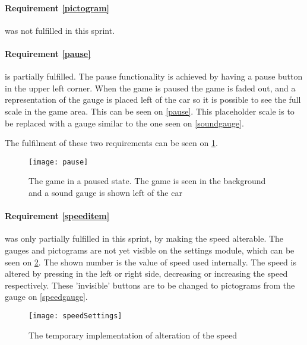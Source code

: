 \paragraph{Requirement \ref{pictogram}} was not fulfilled in this sprint.


\paragraph{Requirement \ref{pause}} is partially fulfilled.
The pause functionality is achieved by having a pause button in the upper left corner. 
When the game is paused the game is faded out, and a representation of the gauge is placed left of the car so it is possible to see the full scale in the game area.
This can be seen on \cref{pause}.
This placeholder scale is to be replaced with a gauge similar to the one seen on \cref{soundgauge}.

The fulfilment of these two requirements can be seen on \cref{pausedstate}.

\begin{figure}
\texttt{[image: pause]}	
\caption{The game in a paused state. The game is seen in the background and a sound gauge is shown left of the car}
\label{pausedstate}
\end{figure}


\paragraph{Requirement \ref{speeditem}} was only partially fulfilled in this sprint, by making the speed alterable. 
The gauges and pictograms are not yet visible on the settings module, which can be seen on \cref{speedsettings}.
The shown number is the value of speed used internally.
The speed is altered by pressing in the left or right side, decreasing or increasing the speed respectively.
These 'invisible' buttons are to be changed to pictograms from the gauge on \cref{speedgauge}.

\begin{figure}
\texttt{[image: speedSettings]}
\caption{The temporary implementation of alteration of the speed}
\label{speedsettings}
\end{figure}



